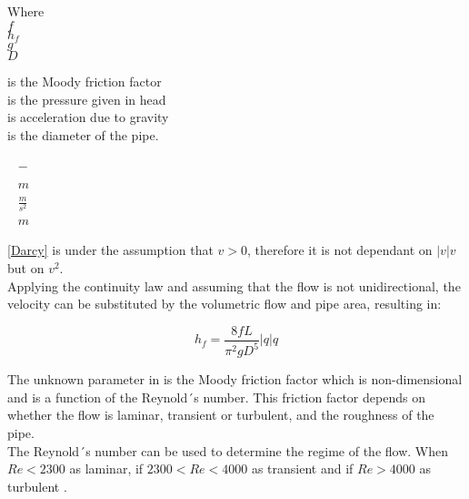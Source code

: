  \begin{minipage}[t]{0.20\textwidth}
Where\\
\hspace*{8mm} $f$ \\
\hspace*{8mm} $h_f$ \\
\hspace*{8mm} $g$ \\
\hspace*{8mm} $D$ 
\end{minipage}
\begin{minipage}[t]{0.68\textwidth}
\vspace*{2mm}
is the Moody friction factor\\ 
is the pressure given in head\\ 
is acceleration due to gravity\\
is the diameter of the pipe.
\end{minipage}
\begin{minipage}[t]{0.10\textwidth}
\vspace*{2mm}
\textcolor{White}{te}$\unit{-}$\\
\textcolor{White}{te}$\unit{m}$\\
\textcolor{White}{te}$\unit{\frac{m}{s^2}}$\\
\textcolor{White}{te}$\unit{m}$
\end{minipage}

\eqref{Darcy} is under the assumption that $v>0$, therefore it is not dependant on $|v|v$ but on $v^2$. \\
Applying the continuity law and assuming that the flow is not unidirectional, the velocity can be substituted by the volumetric flow and pipe area, resulting in:

\begin{equation}
  h_f = \frac{8fL}{\pi^{2}gD^5} |q| q
  \label{DarcyWeisbach}
\end{equation} 
 
 The unknown parameter in  is the Moody friction factor 
 which is non-dimensional and is a function of the Reynold´s number. This friction factor depends on whether the flow is laminar, transient or turbulent, and the roughness of the pipe. \\
 
 
The Reynold´s number can be used to determine the regime of the flow. When $Re<2300$ as laminar, if $2300<Re<4000$ as transient and if
$Re>4000$ as turbulent \cite{Intro_Fluid}. 


